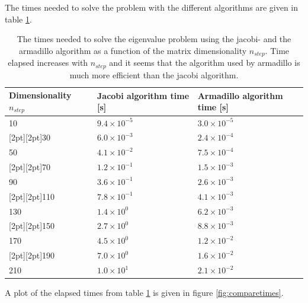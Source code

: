 \documentclass[a4paper,10pt,english]{article}
\numberwithin{figure}{subsection}
\numberwithin{table}{subsection}
\numberwithin{equation}{subsection}
\newcommand{\shaderow}{\rowcolor{gray!20}[2pt][2pt]}
\begin{document}
The times needed to solve the problem with the different algorithms are
given in table \ref{tab:comparetimes}. 

\begin{table}[h!]
  \centering 
  \begin{tabular}{l @{ }  l @{  }l}
    \toprule
    Dimensionality $n_{step}~~$ & Jacobi algorithm time [s]$~~$& Armadillo algorithm time [s] \\
    \midrule
    10 & $9.4\times 10^{-5}$ & $3.0 \times 10^{-5}$ \\
    \shaderow 30 & $6.0 \times 10^{-3}$  &$2.4 \times 10^{-4}$  \\
    50 & $4.1\times 10^{-2}$ & $7.5\times 10^{-4}$ \\
    \shaderow 70 & $1.2 \times 10^{-1}$ & $1.5 \times 10^{-3}$ \\
    90 & $3.6 \times 10^{-1}$ & $2.6 \times 10^{-3}$ \\
    \shaderow 110 &$7.8 \times 10^{-1}$ & $4.1 \times 10^{-3}$ \\
    130 &$1.4 \times 10^{0}$ &  $6.2 \times 10^{-3}$\\
    \shaderow 150 &$2.7 \times 10^{0}$ &  $8.8 \times 10^{-3}$\\
    170 &$4.5 \times 10^{0}$ &  $1.2 \times 10^{-2}$\\
    \shaderow 190 &$7.0 \times 10^{0}$ &  $1.6 \times 10^{-2}$\\
    210 &$1.0 \times 10^{1}$ &  $2.1 \times 10^{-2}$ \\
    \bottomrule
  \end{tabular}
  \caption{The times needed to solve the eigenvalue problem using the jacobi- and the 
            armadillo algorithm as a function of the matrix dimensionality $n_{step}$. 
            Time elapsed increases with $n_{step}$ and it seems that the algorithm
            used by armadillo is much more efficient than the jacobi algorithm.}
  \label{tab:comparetimes}
\end{table}

A plot of the elapsed times from table \ref{tab:comparetimes} is given in figure
\ref{fig:comparetimes}. 
\end{document}
